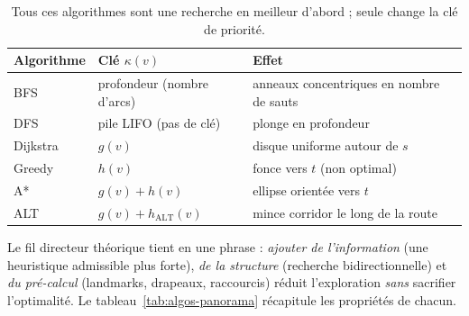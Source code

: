 \begin{table}[htbp]
  \centering
  \small
  \begin{tabular}{@{}lll@{}}
    \toprule
    Algorithme & Clé $\kappa(v)$ & Effet \\
    \midrule
    BFS       & profondeur (nombre d'arcs) & anneaux concentriques en nombre de sauts \\
    DFS       & pile LIFO (pas de clé)     & plonge en profondeur \\
    Dijkstra  & $g(v)$                     & disque uniforme autour de $s$ \\
    Greedy    & $h(v)$                     & fonce vers $t$ (non optimal) \\
    A*        & $g(v) + h(v)$              & ellipse orientée vers $t$ \\
    ALT       & $g(v) + h_{\text{ALT}}(v)$ & mince corridor le long de la route \\
    \bottomrule
  \end{tabular}
  \caption{Tous ces algorithmes sont une recherche en meilleur d'abord ; seule
  change la clé de priorité.}
  \label{tab:cle}
\end{table}

Le fil directeur théorique tient en une phrase : \emph{ajouter de l'information}
(une heuristique admissible plus forte), \emph{de la structure} (recherche
bidirectionnelle) et \emph{du pré-calcul} (landmarks, drapeaux, raccourcis)
réduit l'exploration \emph{sans} sacrifier l'optimalité. Le
tableau~\ref{tab:algos-panorama} récapitule les propriétés de chacun.

